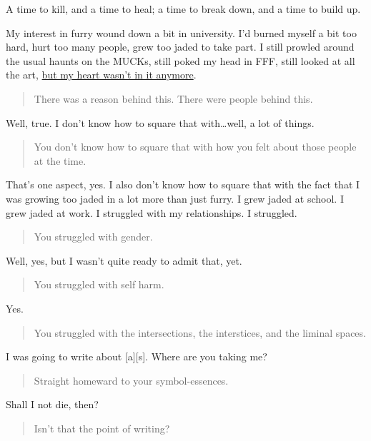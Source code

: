 A time to kill, and a time to heal; a time to break down, and a time to build up.

My interest in furry wound down a bit in university. I'd burned myself a bit too hard, hurt too many people, grew too jaded to take part. I still prowled around the usual haunts on the MUCKs, still poked my head in FFF, still looked at all the art, \href{https://adjectivespecies.com/2012/03/21/makyos-kaddish/}{but my heart wasn't in it anymore}.

\begin{quote}
There was a reason behind this. There were people behind this.
\end{quote}

Well, true. I don't know how to square that with\ldots{}well, a lot of things.

\begin{quote}
You don't know how to square that with how you felt about those people at the time.
\end{quote}

That's one aspect, yes. I also don't know how to square that with the fact that I was growing too jaded in a lot more than just furry. I grew jaded at school. I grew jaded at work. I struggled with my relationships. I struggled.

\begin{quote}
You struggled with gender.
\end{quote}

Well, yes, but I wasn't quite ready to admit that, yet.

\begin{quote}
You struggled with self harm.
\end{quote}

Yes.

\begin{quote}
You struggled with the intersections, the interstices, and the liminal spaces.
\end{quote}

I was going to write about {[}a{]}{[}s{]}. Where are you taking me?

\begin{quote}
Straight homeward to your symbol-essences.
\end{quote}

Shall I not die, then?

\begin{quote}
Isn't that the point of writing?
\end{quote}

